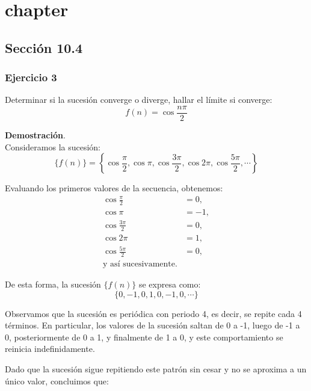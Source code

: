 \documentclass{article}
\begin{document}


\chapter{chapter}

\section*{Sección 10.4}
    \subsection*{Ejercicio 3}

    Determinar si la sucesión converge o diverge, hallar el límite si converge:
    $$
    f(n)=\cos \frac{n \pi}{2}
    $$

    \textbf{Demostración}.\\

    Consideramos la sucesión:
    $$
    \{f(n)\}=\left\{\cos \frac{\pi}{2}, \cos \pi, \cos \frac{3 \pi}{2}, \cos 2 \pi, \cos \frac{5 \pi}{2}, \cdots\right\}
    $$

    Evaluando los primeros valores de la secuencia, obtenemos:
    \begin{align*}
    \cos \frac{\pi}{2} &= 0, \\
    \cos \pi &= -1, \\
    \cos \frac{3 \pi}{2} &= 0, \\
    \cos 2 \pi &= 1, \\
    \cos \frac{5 \pi}{2} &= 0, \\
    \text{y así sucesivamente}.
    \end{align*}

    De esta forma, la sucesión $\{f(n)\}$ se expresa como:
    $$
    \{0, -1, 0, 1, 0, -1, 0, \cdots\}
    $$

    Observamos que la sucesión es periódica con periodo 4, es decir, se repite cada 4 términos. En particular, los valores de la sucesión saltan de 0 a -1, luego de -1 a 0, posteriormente de 0 a 1, y finalmente de 1 a 0, y este comportamiento se reinicia indefinidamente.

    Dado que la sucesión sigue repitiendo este patrón sin cesar y no se aproxima a un único valor, concluimos que:
\end{document}
